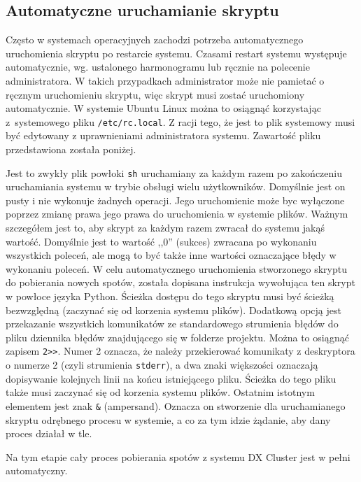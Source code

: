 \documentclass[]{mgr}
\begin{document}
            \subsection{Automatyczne uruchamianie skryptu}
            Często w systemach operacyjnych zachodzi potrzeba automatycznego uruchomienia skryptu po restarcie systemu. Czasami restart systemu występuje automatycznie, wg. ustalonego harmonogramu lub ręcznie na polecenie administratora. W takich przypadkach administrator może nie pamietać o ręcznym uruchomieniu skryptu, więc skrypt musi zostać uruchomiony automatycznie. W systemie Ubuntu Linux można to osiągnąć korzystając z~systemowego pliku \texttt{/etc/rc.local}. Z racji tego, że jest to plik systemowy musi być edytowany z uprawnieniami administratora systemu. Zawartość pliku przedstawiona została poniżej.
            
            Jest to zwykły plik powłoki \texttt{sh} uruchamiany za każdym razem po zakończeniu uruchamiania systemu w trybie obsługi wielu użytkowników. Domyślnie jest on pusty i nie wykonuje żadnych operacji. Jego uruchomienie może byc wyłączone poprzez zmianę prawa jego prawa do uruchomienia w systemie plików. Ważnym szczegółem jest to, aby skrypt za każdym razem zwracał do systemu jakąś wartość. Domyślnie jest to wartość ,,0'' (sukces) zwracana po wykonaniu wszystkich poleceń, ale mogą to być także inne wartości oznaczające błędy w wykonaniu poleceń. W celu automatycznego uruchomienia stworzonego skryptu do pobierania nowych spotów, została dopisana instrukcja wywołująca ten skrypt w powłoce języka Python. Ścieżka dostępu do tego skryptu musi być ścieżką bezwzględną (zaczynać się od korzenia systemu plików). Dodatkową opcją jest przekazanie wszystkich komunikatów ze standardowego strumienia błędów do pliku dziennika błędów znajdującego się w folderze projektu. Można to osiągnąć zapisem 
            \texttt{2>{}>}. Numer 2 oznacza, że należy przekierować komunikaty z deskryptora o numerze 2 (czyli strumienia \texttt{stderr}), a dwa znaki większości oznaczają dopisywanie kolejnych linii na końcu istniejącego pliku. Ścieżka do tego pliku także musi zaczynać się od korzenia systemu plików. Ostatnim istotnym elementem jest znak \texttt{\&} (ampersand). Oznacza on stworzenie dla uruchamianego skryptu odrębnego procesu w systemie, a co za tym idzie żądanie, aby dany proces działał w tle.

            Na tym etapie cały proces pobierania spotów z systemu DX Cluster jest w pełni automatyczny.
\end{document}
